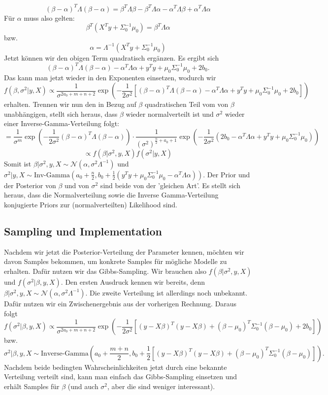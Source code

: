 \documentclass{article}
\begin{document}
    \[
    (\beta-\alpha)^T\Lambda(\beta-\alpha)=
    \beta^T\Lambda\beta-\beta^T\Lambda\alpha-\alpha^T\Lambda\beta+\alpha^T\Lambda\alpha
    \]Für \(\alpha\) muss also gelten:\[
    \beta^T(X^Ty+\Sigma_0^{-1}\mu_0)=\beta^T\Lambda\alpha
    \]bzw.\[
    \alpha = \Lambda^{-1}(X^Ty+\Sigma_0^{-1}\mu_0)
    \]Jetzt können wir den obigen Term quadratisch ergänzen. Es ergibt sich\[
    (\beta-\alpha)^T\Lambda(\beta-\alpha)-\alpha^T\Lambda\alpha+y^Ty+\mu_0\Sigma_0^{-1}\mu_0+2b_0.
    \]Das kann man jetzt wieder in den Exponenten einsetzen, wodurch wir
    \[
    f(\beta,\sigma^2|y,X)\propto
    \frac{1}{\sigma^{2a_0+m+n+2}}\exp(-\frac1{2\sigma^2}[(\beta-\alpha)^T\Lambda(\beta-\alpha)-\alpha^T\Lambda\alpha+y^Ty+\mu_0\Sigma_0^{-1}\mu_0+2b_0])
    \]erhalten. Trennen wir nun den in Bezug auf \(\beta\) quadratischen Teil vom von \(\beta\) unabhängigen, stellt sich heraus, dass \(\beta\) wieder normalverteilt ist und \(\sigma^2\) wieder einer Inverse-Gamma-Verteilung folgt:
    \[
    =\frac1{\sigma^m}\exp(-\frac1{2\sigma^2}(\beta-\alpha)^T\Lambda(\beta-\alpha))
    \cdot\frac{1}{(\sigma^2)^{\frac n2+a_0+1}}\exp(-\frac1{2\sigma^2}(2b_0-\alpha^T\Lambda\alpha+y^Ty+\mu_0\Sigma_0^{-1}\mu_0))
    \]\[
    \propto f(\beta|\sigma^2,y,X)f(\sigma^2|y,X)
    \]Somit ist \(\beta|\sigma^2,y,X\sim\mathcal N(\alpha,\sigma^2\Lambda^{-1})\) und \(\sigma^2|y,X\sim \text{Inv-Gamma}(a_0+\frac n2,b_0+\frac12(y^Ty+\mu_0\Sigma_0^{-1}\mu_0-\alpha^T\Lambda\alpha))\). Der Prior und der Posterior von \(\beta\) und von \(\sigma^2\) sind beide von der 'gleichen Art'. Es stellt sich heraus, dass die Normalverteilung sowie die Inverse Gamma-Verteilung konjugierte Priors zur (normalverteilten) Likelihood sind.


    \subsection{Sampling und Implementation}
    Nachdem wir jetzt die Posterior-Verteilung der Parameter kennen, möchten wir davon Samples bekommen, um konkrete Samples für mögliche Modelle zu erhalten. Dafür nutzen wir das Gibbs-Sampling. Wir brauchen also \(f(\beta|\sigma^2, y,X)\) und \(f(\sigma^2|\beta, y,X)\). Den ersten Ausdruck kennen wir bereits, denn \(\beta|\sigma^2,y,X\sim\mathcal N(\alpha,\sigma^2\Lambda^{-1})\). Die zweite Verteilung ist allerdings noch unbekannt. Dafür nutzen wir ein Zwischenergebnis aus der vorherigen Rechnung. Daraus folgt
    \[
    f(\sigma^2|\beta,y,X)\propto \frac{1}{\sigma^{2a_0+m+n+2}}\exp\left(-\frac1{2\sigma^2}[(y-X\beta)^T(y-X\beta)+(\beta-\mu_0)^T\Sigma_0^{-1}(\beta-\mu_0)+2b_0]\right)
    \]bzw.\[
    \sigma^2|\beta,y,X\sim\text{Inverse-Gamma}(a_0+\frac{m+n}2,b_0+\frac12[(y-X\beta)^T(y-X\beta)+(\beta-\mu_0)^T\Sigma_0^{-1}(\beta-\mu_0)]).
    \]
    Nachdem beide bedingten Wahrscheinlichkeiten jetzt durch eine bekannte Verteilung verteilt sind, kann man einfach das Gibbs-Sampling einsetzen und erhält Samples für \(\beta\) (und auch \(\sigma^2\), aber die sind weniger interessant).
\end{document}
